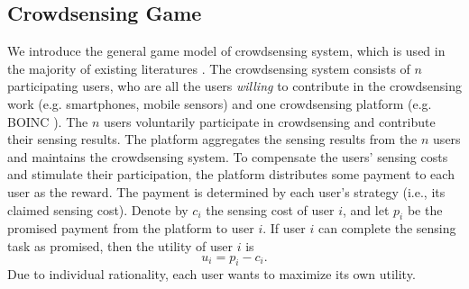 \documentclass[conference]{IEEEtran}
\theoremstyle{definition}
\begin{document}
\subsection{Crowdsensing Game}
\label{subsec:CG}
{
We introduce the general game model of crowdsensing system, which is used in the majority of existing literatures \cite{yang2012crowdsourcing,koutsopoulos2013optimal,luo2014profit,zhang2014free,liu2014social,yan2015ifc}. The crowdsensing system consists of $n$ participating users, who are all the users \emph{willing} to contribute in the crowdsensing work (e.g. smartphones, mobile sensors) and one crowdsensing platform (e.g. BOINC \cite{anderson2004boinc}). The $n$ users voluntarily participate in crowdsensing and contribute their sensing results. The platform aggregates the sensing results from the $n$ users and maintains the crowdsensing system. %
To compensate the users' sensing costs and stimulate their participation, the platform distributes some payment to each user as the reward. The payment is determined by each user's strategy (i.e., its claimed sensing cost). Denote by $c_i$ the sensing cost of user $i$, and let $p_i$ be the promised payment from the platform to user $i$. If user $i$ can complete the sensing task as promised, then the utility of user $i$ is
\begin{equation}
\label{eqn:user_utility_1}
u_i = p_i-c_i.
\end{equation}
Due to individual rationality, each user wants to maximize its own utility. %

}
\end{document}
